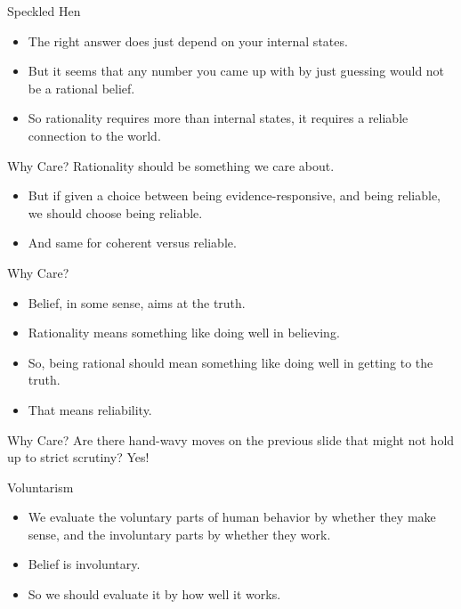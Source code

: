 \documentclass[
  17pt,
  letterpaper,
  ignorenonframetext,
  aspectratio=169,
]{beamer}
\providecommand{\tightlist}{%
  \setlength{\itemsep}{0pt}\setlength{\parskip}{0pt}}\usepackage{longtable,booktabs,array}
\begin{document}
\begin{frame}{Speckled Hen}
\protect\hypertarget{speckled-hen-1}{}
\begin{itemize}[<+->]
\tightlist
\item
  The right answer does just depend on your internal states.
\item
  But it seems that any number you came up with by just guessing would
  not be a rational belief.
\item
  So rationality requires more than internal states, it requires a
  reliable connection to the world.
\end{itemize}
\end{frame}

\begin{frame}{Why Care?}
\protect\hypertarget{why-care}{}
Rationality should be something we care about.

\begin{itemize}[<+->]
\tightlist
\item
  But if given a choice between being evidence-responsive, and being
  reliable, we should choose being reliable.
\item
  And same for coherent versus reliable.
\end{itemize}
\end{frame}

\begin{frame}{Why Care?}
\protect\hypertarget{why-care-1}{}
\begin{itemize}[<+->]
\tightlist
\item
  Belief, in some sense, aims at the truth.
\item
  Rationality means something like doing well in believing.
\item
  So, being rational should mean something like doing well in getting to
  the truth.
\item
  That means reliability.
\end{itemize}
\end{frame}

\begin{frame}{Why Care?}
\protect\hypertarget{why-care-2}{}
Are there hand-wavy moves on the previous slide that might not hold up
to strict scrutiny? Yes!
\end{frame}

\begin{frame}{Voluntarism}
\protect\hypertarget{voluntarism}{}
\begin{itemize}[<+->]
\tightlist
\item
  We evaluate the voluntary parts of human behavior by whether they make
  sense, and the involuntary parts by whether they work.
\item
  Belief is involuntary.
\item
  So we should evaluate it by how well it works.
\end{itemize}
\end{frame}
\end{document}
